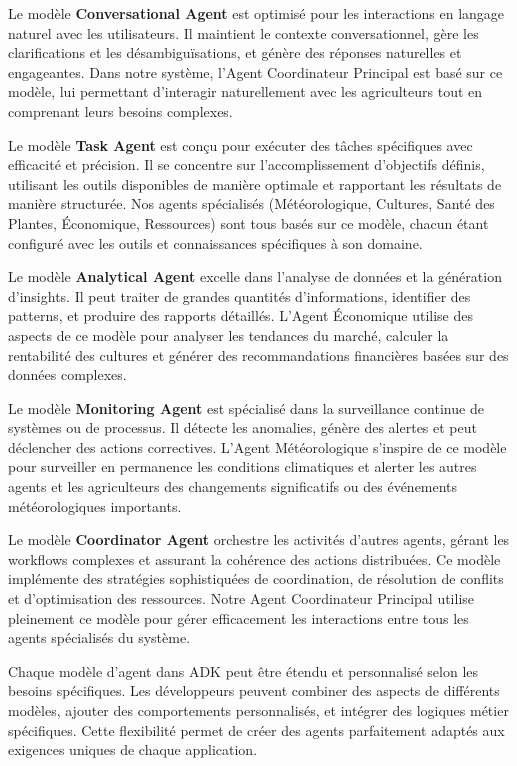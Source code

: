 Le modèle \textbf{Conversational Agent} est optimisé pour les interactions en langage naturel avec les utilisateurs. Il maintient le contexte conversationnel, gère les clarifications et les désambiguïsations, et génère des réponses naturelles et engageantes. Dans notre système, l'Agent Coordinateur Principal est basé sur ce modèle, lui permettant d'interagir naturellement avec les agriculteurs tout en comprenant leurs besoins complexes.

Le modèle \textbf{Task Agent} est conçu pour exécuter des tâches spécifiques avec efficacité et précision. Il se concentre sur l'accomplissement d'objectifs définis, utilisant les outils disponibles de manière optimale et rapportant les résultats de manière structurée. Nos agents spécialisés (Météorologique, Cultures, Santé des Plantes, Économique, Ressources) sont tous basés sur ce modèle, chacun étant configuré avec les outils et connaissances spécifiques à son domaine.

Le modèle \textbf{Analytical Agent} excelle dans l'analyse de données et la génération d'insights. Il peut traiter de grandes quantités d'informations, identifier des patterns, et produire des rapports détaillés. L'Agent Économique utilise des aspects de ce modèle pour analyser les tendances du marché, calculer la rentabilité des cultures et générer des recommandations financières basées sur des données complexes.

Le modèle \textbf{Monitoring Agent} est spécialisé dans la surveillance continue de systèmes ou de processus. Il détecte les anomalies, génère des alertes et peut déclencher des actions correctives. L'Agent Météorologique s'inspire de ce modèle pour surveiller en permanence les conditions climatiques et alerter les autres agents et les agriculteurs des changements significatifs ou des événements météorologiques importants.

Le modèle \textbf{Coordinator Agent} orchestre les activités d'autres agents, gérant les workflows complexes et assurant la cohérence des actions distribuées. Ce modèle implémente des stratégies sophistiquées de coordination, de résolution de conflits et d'optimisation des ressources. Notre Agent Coordinateur Principal utilise pleinement ce modèle pour gérer efficacement les interactions entre tous les agents spécialisés du système.

Chaque modèle d'agent dans ADK peut être étendu et personnalisé selon les besoins spécifiques. Les développeurs peuvent combiner des aspects de différents modèles, ajouter des comportements personnalisés, et intégrer des logiques métier spécifiques. Cette flexibilité permet de créer des agents parfaitement adaptés aux exigences uniques de chaque application.

